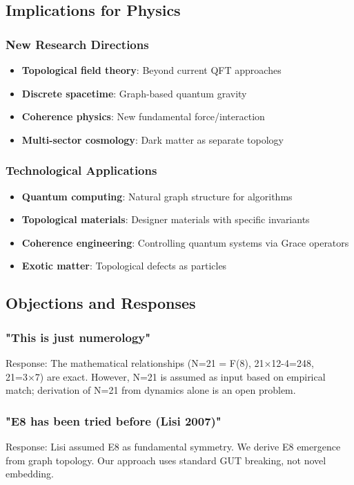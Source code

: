 \documentclass[12pt,a4paper]{article}
\begin{document}
\subsection{Implications for Physics}

\subsubsection{New Research Directions}
\begin{itemize}
\item \textbf{Topological field theory}: Beyond current QFT approaches
\item \textbf{Discrete spacetime}: Graph-based quantum gravity
\item \textbf{Coherence physics}: New fundamental force/interaction
\item \textbf{Multi-sector cosmology}: Dark matter as separate topology
\end{itemize}

\subsubsection{Technological Applications}
\begin{itemize}
\item \textbf{Quantum computing}: Natural graph structure for algorithms
\item \textbf{Topological materials}: Designer materials with specific invariants
\item \textbf{Coherence engineering}: Controlling quantum systems via Grace operators
\item \textbf{Exotic matter}: Topological defects as particles
\end{itemize}

\subsection{Objections and Responses}

\subsubsection{"This is just numerology"}
Response: The mathematical relationships (N=21 = F(8), 21×12-4=248, 21=3×7) are exact. However, N=21 is assumed as input based on empirical match; derivation of N=21 from dynamics alone is an open problem.

\subsubsection{"E8 has been tried before (Lisi 2007)"}
Response: Lisi assumed E8 as fundamental symmetry. We derive E8 emergence from graph topology. Our approach uses standard GUT breaking, not novel embedding.
\end{document}
